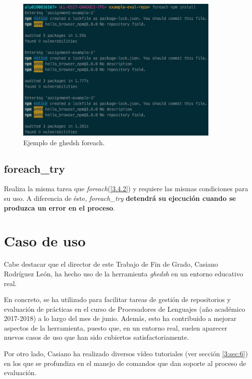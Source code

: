\begin{figure}[H]
	\begin{center}
	\includegraphics[width=0.9\textwidth]{images/foreach-example.png}
	\caption{Ejemplo de ghedsh foreach.}
	\label{fig:foreach-example}
	\end{center}
\end{figure}

\subsection{foreach\_try}
\label{3.4.3}

Realiza la misma tarea que {\it foreach}(\ref{3.4.2}) y requiere las mismas condiciones para su uso. A diferencia de éste, {\it foreach\_try} \textbf{detendrá su ejecución cuando se produzca un error en el proceso}.

\section{Caso de uso}
\label{3:sec:5}

Cabe destacar que el director de este Trabajo de Fin de Grado, Casiano Rodríguez León, ha hecho uso de la herramienta {\it ghedsh} en un entorno educativo real.
\bigskip

En concreto, se ha utilizado para facilitar tareas de gestión de repositorios y evaluación de prácticas en el curso de Procesadores de Lenguajes (año académico 2017-2018) a lo largo del mes de junio. Además, esto ha contribuido a mejorar aspectos de la herramienta,
puesto que, en un entorno real, suelen aparecer nuevos casos de uso que han sido cubiertos satisfactoriamente.
\bigskip

Por otro lado, Casiano ha realizado diversos vídeo tutoriales (ver sección \ref{3:sec:6}) en los que se profundiza en el manejo de comandos que dan soporte al proceso de evaluación.

